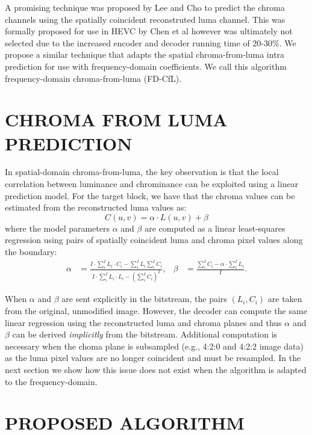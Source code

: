 \documentclass[a4paper]{spie}  %
\begin{document}
A promising technique was proposed by Lee and Cho to predict the chroma
 channels using the spatially coincident reconstruted luma
 channel\cite{LeeCho09}.
This was formally proposed for use in HEVC by Chen et al\cite{JCTVCB021}
 however was ultimately not selected due to the increased encoder and decoder
 running time of 20-30\%.
We propose a similar technique that adapts the spatial chroma-from-luma
 intra prediction for use with frequency-domain coefficients.
We call this algorithm frequency-domain chroma-from-luma (FD-CfL).

\section{CHROMA FROM LUMA PREDICTION}
\label{sec:chroma}

In spatial-domain chroma-from-luma, the key observation is that the local
 correlation between luminance and chrominance can be exploited using a linear
 prediction model.
For the target block, we have that the chroma values can be estimated from the
 reconstructed luma values as:
$$C(u,v) = \alpha\cdot L(u,v) + \beta$$
where the model parameters $\alpha$ and $\beta$ are computed as a linear
 least-squares regression using pairs of spatially coincident luma and chroma
 pixel values along the boundary:
\begin{align}
\alpha & = \frac{I\cdot\displaystyle\sum_i^I L_i\cdot C_i - \displaystyle\sum_i^I L_i\displaystyle\sum_i^I C_i}{I\cdot\displaystyle\sum_i^I L_i\cdot L_i - \left(\displaystyle\sum_i^I C_i\right)^2}, & \beta & = \frac{\displaystyle\sum_i^I C_i -\alpha\cdot\displaystyle\sum_i^I L_i}{I}.
\label{eqn:fit}
\end{align}

When $\alpha$ and $\beta$ are sent explicitly in the bitstream, the pairs
 $(L_i,C_i)$ are taken from the original, unmodified image.
However, the decoder can compute the same linear regression using the
 reconstructed luma and chroma planes and thus $\alpha$ and $\beta$ can be
 derived {\em implicitly} from the bitstream.
Additional computation is necessary when the choma plane is subsampled (e.g.,
 4:2:0 and 4:2:2 image data) as the luma pixel values are no longer coincident
 and must be resampled.
In the next section we show how this issue does not exist when the algorithm
 is adapted to the frequency-domain.

\section{PROPOSED ALGORITHM}
\label{sec:alg}
\end{document}
